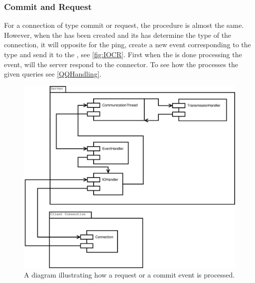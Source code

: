 \subsubsection*{Commit and Request}
For a connection of type commit or request, the procedure is almost the same. However, when the  has been created and its  has determine the type of the connection, it will opposite for the ping, create a new event corresponding to the type and send it to the , see \autoref{fig:IOCR}.
First when the  is done processing the event, will the server respond to the connector.
To see how the  processes the given queries see \autoref{QQHandling}.

\begin{figure}[htbp]
	\centering
		\includegraphics[scale=0.30]{images/requestCommit.eps} %
	\caption{A diagram illustrating how a request or a commit event is processed.}
	\label{fig:IOCR}
\end{figure}